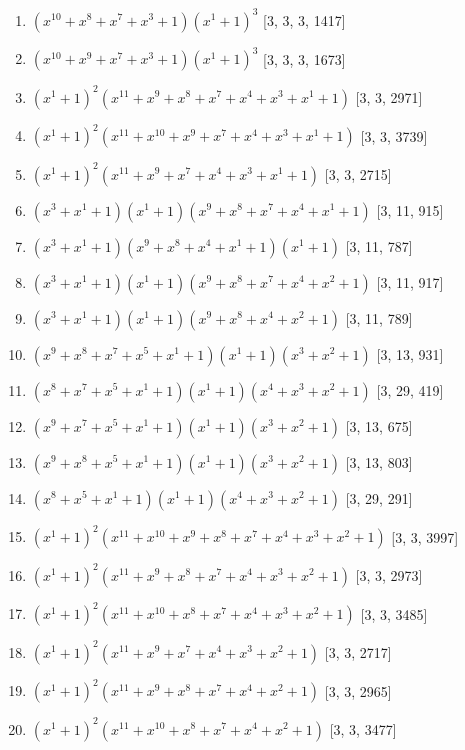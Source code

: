 \documentclass[10pt,twocolumn]{article}
\begin{document}
\begin{enumerate}
\item $(x^{10} + x^{8} + x^{7} + x^{3} + 1)(x^{1} + 1)^{3}$  [3, 3, 3, 1417]
\item $(x^{10} + x^{9} + x^{7} + x^{3} + 1)(x^{1} + 1)^{3}$  [3, 3, 3, 1673]
\item $(x^{1} + 1)^{2}(x^{11} + x^{9} + x^{8} + x^{7} + x^{4} + x^{3} + x^{1} + 1)$  [3, 3, 2971]
\item $(x^{1} + 1)^{2}(x^{11} + x^{10} + x^{9} + x^{7} + x^{4} + x^{3} + x^{1} + 1)$  [3, 3, 3739]
\item $(x^{1} + 1)^{2}(x^{11} + x^{9} + x^{7} + x^{4} + x^{3} + x^{1} + 1)$  [3, 3, 2715]
\item $(x^{3} + x^{1} + 1)(x^{1} + 1)(x^{9} + x^{8} + x^{7} + x^{4} + x^{1} + 1)$  [3, 11, 915]
\item $(x^{3} + x^{1} + 1)(x^{9} + x^{8} + x^{4} + x^{1} + 1)(x^{1} + 1)$  [3, 11, 787]
\item $(x^{3} + x^{1} + 1)(x^{1} + 1)(x^{9} + x^{8} + x^{7} + x^{4} + x^{2} + 1)$  [3, 11, 917]
\item $(x^{3} + x^{1} + 1)(x^{1} + 1)(x^{9} + x^{8} + x^{4} + x^{2} + 1)$  [3, 11, 789]
\item $(x^{9} + x^{8} + x^{7} + x^{5} + x^{1} + 1)(x^{1} + 1)(x^{3} + x^{2} + 1)$  [3, 13, 931]
\item $(x^{8} + x^{7} + x^{5} + x^{1} + 1)(x^{1} + 1)(x^{4} + x^{3} + x^{2} + 1)$  [3, 29, 419]
\item $(x^{9} + x^{7} + x^{5} + x^{1} + 1)(x^{1} + 1)(x^{3} + x^{2} + 1)$  [3, 13, 675]
\item $(x^{9} + x^{8} + x^{5} + x^{1} + 1)(x^{1} + 1)(x^{3} + x^{2} + 1)$  [3, 13, 803]
\item $(x^{8} + x^{5} + x^{1} + 1)(x^{1} + 1)(x^{4} + x^{3} + x^{2} + 1)$  [3, 29, 291]
\item $(x^{1} + 1)^{2}(x^{11} + x^{10} + x^{9} + x^{8} + x^{7} + x^{4} + x^{3} + x^{2} + 1)$  [3, 3, 3997]
\item $(x^{1} + 1)^{2}(x^{11} + x^{9} + x^{8} + x^{7} + x^{4} + x^{3} + x^{2} + 1)$  [3, 3, 2973]
\item $(x^{1} + 1)^{2}(x^{11} + x^{10} + x^{8} + x^{7} + x^{4} + x^{3} + x^{2} + 1)$  [3, 3, 3485]
\item $(x^{1} + 1)^{2}(x^{11} + x^{9} + x^{7} + x^{4} + x^{3} + x^{2} + 1)$  [3, 3, 2717]
\item $(x^{1} + 1)^{2}(x^{11} + x^{9} + x^{8} + x^{7} + x^{4} + x^{2} + 1)$  [3, 3, 2965]
\item $(x^{1} + 1)^{2}(x^{11} + x^{10} + x^{8} + x^{7} + x^{4} + x^{2} + 1)$  [3, 3, 3477]

\end{enumerate}
\end{document}
